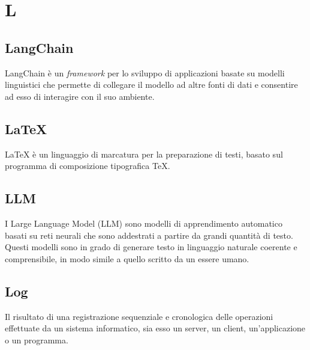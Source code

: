\chapter{L}

\section{LangChain}
LangChain è un \emph{framework} per lo sviluppo di applicazioni basate su modelli linguistici che permette di collegare il modello ad altre fonti di dati e consentire ad esso di interagire con il suo ambiente.

\section{\LaTeX}
LaTeX è un linguaggio di marcatura per la preparazione di testi, basato sul programma di composizione tipografica \TeX.

\section{LLM}
I Large Language Model (LLM) sono modelli di apprendimento automatico basati su reti neurali che sono addestrati a partire da grandi quantità di testo. Questi modelli sono in grado di generare testo in linguaggio naturale coerente e comprensibile, in modo simile a quello scritto da un essere umano.

\section{Log}
Il risultato di una registrazione sequenziale e cronologica delle operazioni effettuate da un sistema informatico, sia esso un server, un client, un'applicazione o un programma.